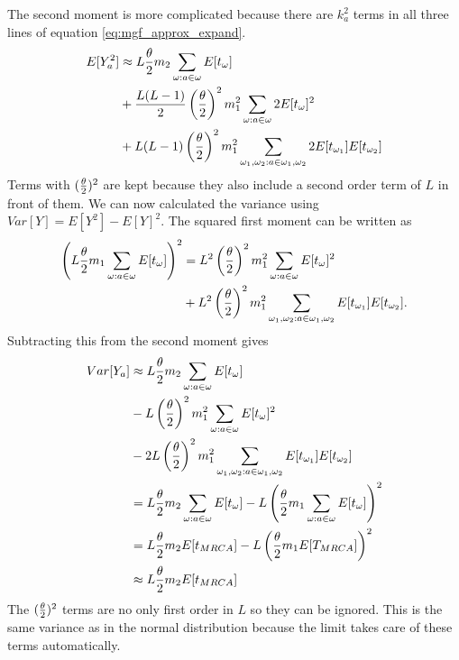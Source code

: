 The second moment is more complicated because there are $k_a^2$ terms in all
three lines of equation \ref{eq:mgf_approx_expand}.
\begin{align}
  E[Y_a^2] &\approx L\frac{\theta}{2} m_2 \sum_{\omega : a \in \omega} E[t_\omega] \nonumber \\
  &+ \frac{L(L-1)}{2} \left(\frac{\theta}{2} \right)^2 m_1^2 \sum_{\omega : a \in \omega} 2 E[t_\omega]^2 \nonumber \\
  &+ L(L-1) \left(\frac{\theta}{2} \right)^2 m_1^2 \sum_{\omega_1 , \omega_2: a \in \omega_1 , \omega_2} 2 E[t_{\omega_1}]E[t_{\omega_2}]
\end{align}
Terms with $(\frac{\theta}{2})^2$ are kept because they also include a second order term of
$L$ in front of them. We can now calculated the variance using $Var[Y]=E[Y^2] -
E[Y]^2$. The squared first moment can be written as
\begin{align}
  \left(L\frac{\theta}{2} m_1 \sum_{\omega : a \in \omega} E[t_\omega] \right)^2 &=
  L^2\left(\frac{\theta}{2}\right)^2 m_1^2 \sum_{\omega : a \in \omega} E[t_\omega]^2 \nonumber \\
  &+ L^2\left(\frac{\theta}{2}\right)^2 m_1^2 \sum_{\omega_1 , \omega_2: a \in \omega_1 , \omega_2} E[t_{\omega_1}]E[t_{\omega_2}].
\end{align}
Subtracting this from the second moment gives
\begin{align}
  \label{eq:var}
  Var[Y_a] &\approx L\frac{\theta}{2} m_2 \sum_{\omega : a \in \omega} E[t_\omega] \nonumber \\
  &- L \left(\frac{\theta}{2}\right)^2 m_1^2 \sum_{\omega : a \in \omega}E[t_\omega]^2 \nonumber \\
  &-  2L \left(\frac{\theta}{2}\right)^2 m_1^2 \sum_{\omega_1 , \omega_2: a \in \omega_1 , \omega_2} E[t_{\omega_1}]E[t_{\omega_2}] \nonumber \\
  &= L\frac{\theta}{2} m_2 \sum_{\omega : a \in \omega} E[t_\omega] -
  L\left( \frac{\theta}{2} m_1 \sum_{\omega : a \in \omega} E[t_\omega] \right)^2 \nonumber \\
  &= L\frac{\theta}{2} m_2 E[t_{MRCA}] - L\left( \frac{\theta}{2} m_1 E[T_{MRCA}] \right)^2 \\
  &\approx L\frac{\theta}{2} m_2 E[t_{MRCA}]  \nonumber
\end{align}
The $(\frac{\theta}{2})^2$ terms are no only first order in $L$ so they can be ignored. This
is the same variance as in the normal distribution because the limit takes care
of these terms automatically.
